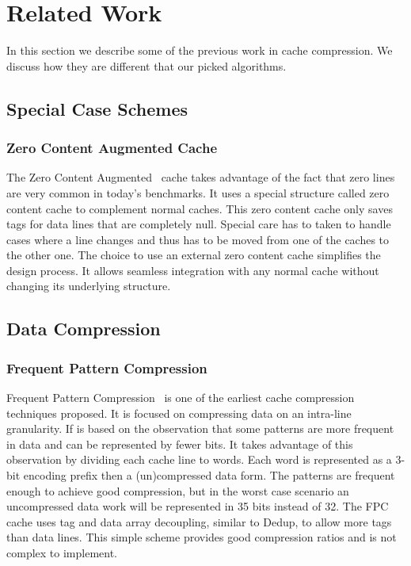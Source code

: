 
\chapter{Related Work}
\label{ch:Related Work}
In this section we describe some of the previous work in cache compression. We discuss how they are different that our picked algorithms.
\section{Special Case Schemes}
\subsection{Zero Content Augmented Cache}
The Zero Content Augmented~\cite{zca} cache takes advantage of the fact that zero lines are very common in today's benchmarks. It uses a special structure called zero content cache to complement normal caches. This zero content cache only saves tags for data lines that are completely null. Special care has to taken to handle cases where a line changes and thus has to be moved from one of the caches to the other one. The choice to use an external zero content cache simplifies the design process. It allows seamless integration with any normal cache without changing its underlying structure.

\section{Data Compression}
\subsection{Frequent Pattern Compression}
\label{ssec:FPC}
Frequent Pattern Compression~\cite{fpc} is one of the earliest cache compression techniques proposed. It is focused on compressing data on an intra-line granularity. If is based on the observation that some patterns are more frequent in data and can be represented by fewer bits. It takes advantage of this observation by dividing each cache line to words. Each word is represented as a 3-bit encoding prefix then a (un)compressed data form. The patterns are frequent enough to achieve good compression, but in the worst case scenario an uncompressed data work will be represented in 35 bits instead of 32. The FPC cache uses tag and data array decoupling, similar to Dedup, to allow more tags than data lines. This simple scheme provides good compression ratios and is not complex to implement.
